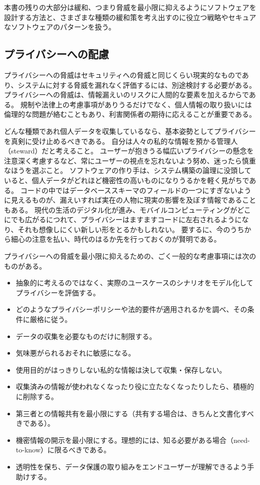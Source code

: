 \documentclass[uplatex]{jsarticle}
\def\label#1{}%
\begin{document}
本書の残りの大部分は緩和、つまり脅威を最小限に抑えるようにソフトウェアを設計する方法と、さまざまな種類の緩和策を考え出すのに役立つ戦略やセキュアなソフトウェアのパターンを扱う。

\subsection{プライバシーへの配慮}\label{subsec:ch2-privacy}

プライバシーへの脅威はセキュリティへの脅威と同じくらい現実的なものであり、システムに対する脅威を漏れなく評価するには、別途検討する必要がある。プライバシーへの脅威は、情報漏えいのリスクに人間的な要素を加えるからである。
規制や法律上の考慮事項がありうるだけでなく、個人情報の取り扱いには倫理的な問題が絡むこともあり、利害関係者の期待に応えることが重要である。

どんな種類であれ個人データを収集しているなら、基本姿勢としてプライバシーを真剣に受け止めるべきである。
自分は人々の私的な情報を預かる管理人（steward）だと考えること。
ユーザーが抱きうる幅広いプライバシーの懸念を注意深く考慮するなど、常にユーザーの視点を忘れないよう努め、迷ったら慎重なほうを選ぶこと。
ソフトウェアの作り手は、システム構築の論理に没頭していると、個人データがどれほど機密性の高いものになりうるかを軽く見がちである。
コードの中ではデータベーススキーマのフィールドの一つにすぎないように見えるものが、漏えいすれば実在の人物に現実の影響を及ぼす情報であることもある。
現代の生活のデジタル化が進み、モバイルコンピューティングがどこにでも広がるにつれて、プライバシーはますますコードに左右されるようになり、それも想像しにくい新しい形をとるかもしれない。
要するに、今のうちから細心の注意を払い、時代のはるか先を行っておくのが賢明である。

\begin{rem}[プライバシーへの脅威を最小化するための一般的な考慮事項]\label{rem:ch2-privacy-considerations}
プライバシーへの脅威を最小限に抑えるための、ごく一般的な考慮事項には次のものがある。
\begin{itemize}
\item 抽象的に考えるのではなく、実際のユースケースのシナリオをモデル化してプライバシーを評価する。
\item どのようなプライバシーポリシーや法的要件が適用されるかを調べ、その条件に厳格に従う。
\item データの収集を必要なものだけに制限する。
\item 気味悪がられるおそれに敏感になる。
\item 使用目的がはっきりしない私的な情報は決して収集・保存しない。
\item 収集済みの情報が使われなくなったり役に立たなくなったりしたら、積極的に削除する。
\item 第三者との情報共有を最小限にする（共有する場合は、きちんと文書化すべきである）。
\item 機密情報の開示を最小限にする。理想的には、知る必要がある場合（need-to-know）に限るべきである。
\item 透明性を保ち、データ保護の取り組みをエンドユーザーが理解できるよう手助けする。
\end{itemize}
\end{rem}
\end{document}
